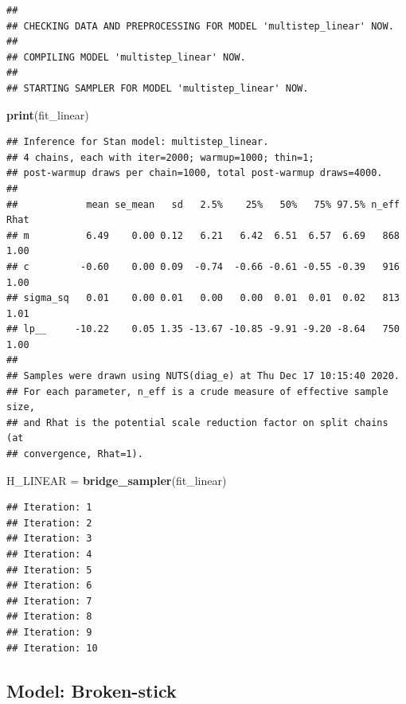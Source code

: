 \documentclass[
]{article}
\newenvironment{Shaded}{\begin{snugshade}}{\end{snugshade}}
\newcommand{\KeywordTok}[1]{\textcolor[rgb]{0.13,0.29,0.53}{\textbf{#1}}}
\newcommand{\NormalTok}[1]{#1}
\newcommand{\StringTok}[1]{\textcolor[rgb]{0.31,0.60,0.02}{#1}}
\begin{document}
\begin{verbatim}
## 
## CHECKING DATA AND PREPROCESSING FOR MODEL 'multistep_linear' NOW.
## 
## COMPILING MODEL 'multistep_linear' NOW.
## 
## STARTING SAMPLER FOR MODEL 'multistep_linear' NOW.
\end{verbatim}

\begin{Shaded}
\begin{Highlighting}[]
\KeywordTok{print}\NormalTok{(fit_linear)}
\end{Highlighting}
\end{Shaded}

\begin{verbatim}
## Inference for Stan model: multistep_linear.
## 4 chains, each with iter=2000; warmup=1000; thin=1; 
## post-warmup draws per chain=1000, total post-warmup draws=4000.
## 
##            mean se_mean   sd   2.5%    25%   50%   75% 97.5% n_eff Rhat
## m          6.49    0.00 0.12   6.21   6.42  6.51  6.57  6.69   868 1.00
## c         -0.60    0.00 0.09  -0.74  -0.66 -0.61 -0.55 -0.39   916 1.00
## sigma_sq   0.01    0.00 0.01   0.00   0.00  0.01  0.01  0.02   813 1.01
## lp__     -10.22    0.05 1.35 -13.67 -10.85 -9.91 -9.20 -8.64   750 1.00
## 
## Samples were drawn using NUTS(diag_e) at Thu Dec 17 10:15:40 2020.
## For each parameter, n_eff is a crude measure of effective sample size,
## and Rhat is the potential scale reduction factor on split chains (at 
## convergence, Rhat=1).
\end{verbatim}

\begin{Shaded}
\begin{Highlighting}[]
\NormalTok{H_LINEAR =}\StringTok{ }\KeywordTok{bridge_sampler}\NormalTok{(fit_linear)}
\end{Highlighting}
\end{Shaded}

\begin{verbatim}
## Iteration: 1
## Iteration: 2
## Iteration: 3
## Iteration: 4
## Iteration: 5
## Iteration: 6
## Iteration: 7
## Iteration: 8
## Iteration: 9
## Iteration: 10
\end{verbatim}

\hypertarget{model-broken-stick}{%
\subsection{Model: Broken-stick}\label{model-broken-stick}}
\end{document}

